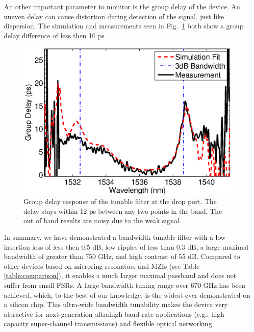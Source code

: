 \documentclass[osajnl,twocolumn,showpacs,superscriptaddress,10pt]{revtex4-1}
\begin{document}
An other important parameter to monitor is the group delay of the device. An uneven delay can cause distortion during detection of the signal, just like dispersion. The simulation and measurements seen in Fig.~\ref{fig:phase} both show a group delay difference of less then 10 ps.
\begin{figure}[tbp]
\centering
\includegraphics[width=.99\columnwidth]{data/Phase}
\caption{ Group delay response of the tunable filter at the drop port. The delay stays within 12 ps between any two points in the band. The out of band results are noisy due to the weak signal.}
\label{fig:phase}
\end{figure}


In summary, we have demonstrated a bandwidth tunable filter with a low insertion loss of less then 0.5 dB, low ripples of less than 0.3 dB, a large maximal bandwidth of greater than 750 GHz, and high contrast of 55 dB. 
Compared to other devices based on microring resonators and MZIs (see Table \ref{table:comparison}), it enables a much larger maximal passband and does not suffer from small FSRs. 
A large bandwidth tuning range over 670 GHz has been achieved, which, to the best of our knowledge, is the widest ever demonstrated on a silicon chip. 
This ultra-wide bandwidth tunability makes the device very attractive for next-generation ultrahigh baud-rate applications (e.g., high-capacity super-channel transmissions) and flexible optical networking. 
\end{document}
